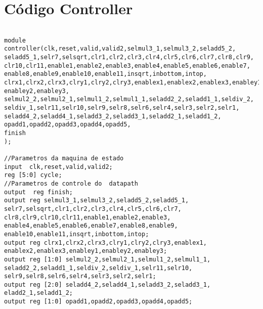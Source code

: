 \section{Código Controller}
\label{codecontroller}
\begin{lstlisting}[style={verilog-style}]

module controller(clk,reset,valid,valid2,selmul3_1,selmul3_2,seladd5_2,
seladd5_1,selr7,selsqrt,clr1,clr2,clr3,clr4,clr5,clr6,clr7,clr8,clr9,
clr10,clr11,enable1,enable2,enable3,enable4,enable5,enable6,enable7,
enable8,enable9,enable10,enable11,insqrt,inbottom,intop,
clrx1,clrx2,clrx3,clry1,clry2,clry3,enablex1,enablex2,enablex3,enabley1,
enabley2,enabley3,
selmul2_2,selmul2_1,selmul1_2,selmul1_1,seladd2_2,seladd1_1,seldiv_2,
seldiv_1,selr11,selr10,selr9,selr8,selr6,selr4,selr3,selr2,selr1,
seladd4_2,seladd4_1,seladd3_2,seladd3_1,seladd2_1,seladd1_2,
opadd1,opadd2,opadd3,opadd4,opadd5,
finish
);

//Parametros da maquina de estado
input  clk,reset,valid,valid2;
reg [5:0] cycle;
//Parametros de controle do  datapath
output  reg finish;
output reg selmul3_1,selmul3_2,seladd5_2,seladd5_1,
selr7,selsqrt,clr1,clr2,clr3,clr4,clr5,clr6,clr7,
clr8,clr9,clr10,clr11,enable1,enable2,enable3,
enable4,enable5,enable6,enable7,enable8,enable9,
enable10,enable11,insqrt,inbottom,intop;
output reg clrx1,clrx2,clrx3,clry1,clry2,clry3,enablex1,
enablex2,enablex3,enabley1,enabley2,enabley3;
output reg [1:0] selmul2_2,selmul2_1,selmul1_2,selmul1_1,
seladd2_2,seladd1_1,seldiv_2,seldiv_1,selr11,selr10,
selr9,selr8,selr6,selr4,selr3,selr2,selr1;
output reg [2:0] seladd4_2,seladd4_1,seladd3_2,seladd3_1,
eladd2_1,seladd1_2;
output reg [1:0] opadd1,opadd2,opadd3,opadd4,opadd5;



\end{lstlisting}
